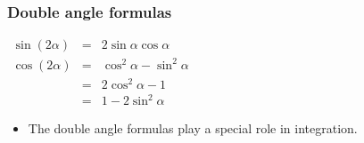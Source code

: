 \begin{frame}
\frametitle{Double angle formulas}
\begin{proposition}
$
\begin{array}{rcl}
\sin (2\alpha)&=&2\sin \alpha\cos \alpha \\
\cos(2\alpha)&=&\cos^{2}\alpha-\sin^2\alpha\\
&=&2\cos^2\alpha-1\\
&=&1-2\sin^{2}\alpha
\end{array}
$
\end{proposition}
\begin{itemize}
\item<2-> The double angle formulas play a special role in integration.
\end{itemize}
\end{frame}